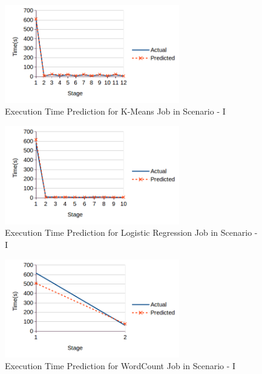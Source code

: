 \begin{figure}[!t]
\centering
\captionsetup{justification=centering}
\includegraphics[width=3in]{figures/B_km.png}
\caption{Execution Time Prediction for K-Means Job in Scenario - I}
\label{bkm}
\end{figure}

\begin{figure}[!t]
\centering
\captionsetup{justification=centering}
\includegraphics[width=3in]{figures/B_lr.png}
\caption{Execution Time Prediction for Logistic Regression Job in Scenario - I}
\label{blr}
\end{figure}

\begin{figure}[!t]
\centering
\captionsetup{justification=centering}
\includegraphics[width=3in]{figures/B_wc.png}
\caption{Execution Time Prediction for WordCount Job in Scenario - I}
\label{bwc}
\end{figure}



